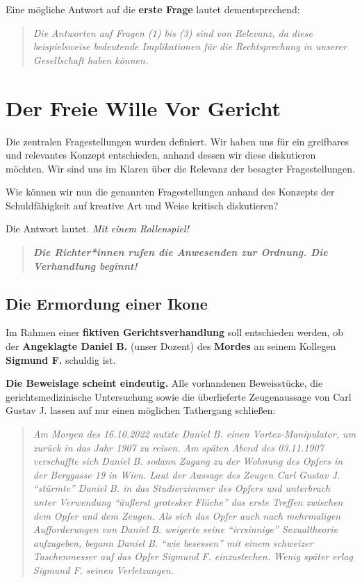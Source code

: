 \documentclass[
  a4paper,
]{report}
\begin{document}
Eine mögliche Antwort auf die \textbf{erste Frage} lautet dementsprechend:

\begin{quote}
\emph{Die Antworten auf Fragen (1) bis (3) sind von Relevanz, da diese beispielsweise bedeutende Implikationen für die Rechtsprechung in unserer Gesellschaft haben können.}
\end{quote}

\hypertarget{freewill-atcourt}{%
\chapter{Der Freie Wille Vor Gericht}\label{freewill-atcourt}}

Die zentralen Fragestellungen wurden definiert. Wir haben uns für ein greifbares und relevantes Konzept entschieden, anhand dessen wir diese diskutieren möchten. Wir sind uns im Klaren über die Relevanz der besagter Fragestellungen.

Wie können wir nun die genannten Fragestellungen anhand des Konzepts der Schuldfähigkeit auf kreative Art und Weise kritisch diskutieren?

Die Antwort lautet. \emph{Mit einem Rollenspiel!}

\begin{quote}
\textbf{\emph{Die Richter*innen rufen die Anwesenden zur Ordnung. Die Verhandlung beginnt!}}
\end{quote}

\hypertarget{deathofanicon}{%
\section{Die Ermordung einer Ikone}\label{deathofanicon}}

Im Rahmen einer \textbf{fiktiven Gerichtsverhandlung} soll entschieden werden, ob der \textbf{Angeklagte Daniel B.} (unser Dozent) des \textbf{Mordes} an seinem Kollegen \textbf{Sigmund F.} schuldig ist.

\textbf{Die Beweislage scheint eindeutig.} Alle vorhandenen Beweisstücke, die gerichtsmedizinische Untersuchung sowie die überlieferte Zeugenaussage von Carl Gustav J. lassen auf nur einen möglichen Tathergang schließen:

\begin{quote}
\emph{Am Morgen des 16.10.2022 nutzte Daniel B. einen Vortex-Manipulator, um zurück in das Jahr 1907 zu reisen. Am späten Abend des 03.11.1907 verschaffte sich Daniel B. sodann Zugang zu der Wohnung des Opfers in der Berggasse 19 in Wien. Laut der Aussage des Zeugen Carl Gustav J. ``stürmte'' Daniel B. in das Studierzimmer des Opfers und unterbrach unter Verwendung ``äußerst grotesker Flüche'' das erste Treffen zwischen dem Opfer und dem Zeugen. Als sich das Opfer auch nach mehrmaligen Aufforderungen von Daniel B. weigerte seine ``irrsinnige'' Sexualtheorie aufzugeben, begann Daniel B. ``wie besessen'' mit einem schweizer Taschenmesser auf das Opfer Sigmund F. einzustechen. Wenig später erlag Sigmund F. seinen Verletzungen.}
\end{quote}
\end{document}
